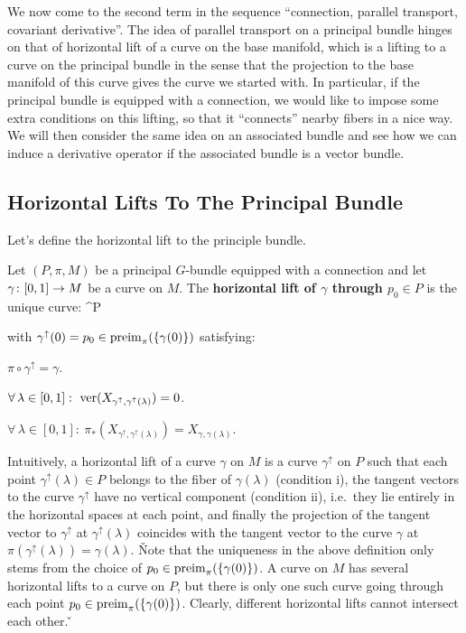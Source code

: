 We now come to the second term in the sequence ``connection, parallel transport, covariant derivative''. The idea of
parallel transport on a principal bundle hinges on that of horizontal lift of a curve on the base manifold, which is
a lifting to a curve on the principal bundle in the sense that the projection to the base manifold of this curve
gives the curve we started with. In particular, if the principal bundle is equipped with a connection, we would like
to impose some extra conditions on this lifting, so that it ``connects'' nearby fibers in a nice way. We will then
consider the same idea on an associated bundle and see how we can induce a derivative operator if the associated
bundle is a vector bundle.

\subsection{Horizontal Lifts To The Principal Bundle}

Let's define the horizontal lift to the principle bundle.

Let $(P,\pi,M)$ be a principal $G$-bundle equipped with a connection and let $\gamma\colon[0,1]\to M$ be a curve on $M$.
The \textbf{horizontal lift of $\gamma$ through $p_0\in P$} is the unique curve:
\bse
\gamma^{\uparrow}\cl [0,1] \to P
\ese

with $\gamma^\uparrow(0)=p_0\in \operatorname{preim}_\pi(\{\gamma(0)\})$ satisfying:
\ben[label=\roman*)]
\item $\pi \circ \gamma^{\uparrow} = \gamma$.
\item $\forall \, \lambda\in [0,1] : \ \ver(X_{\gamma^{\uparrow}, \gamma^{\uparrow}(\lambda)})=0$.
\item $\forall \, \lambda\in [0,1] : \ \pi_*(X_{\gamma^{\uparrow}, \gamma^{\uparrow}(\lambda)})=X_{\gamma,\gamma
(\lambda)}$.
\een
\ed

Intuitively, a horizontal lift of a curve $\gamma$ on $M$ is a curve $\gamma^\uparrow$ on $P$ such that each point
$\gamma^\uparrow(\lambda)\in P$ belongs to the fiber of $\gamma(\lambda)$ (condition i), the tangent vectors to the
curve $\gamma^\uparrow$ have no vertical component (condition ii), i.e.\ they lie entirely in the horizontal spaces
at each point, and finally the projection of the tangent vector to $\gamma^\uparrow$ at $\gamma^\uparrow(\lambda)$
coincides with the tangent vector to the curve $\gamma$ at $\pi (\gamma^\uparrow(\lambda))=\gamma(\lambda)$. \v

Note that the uniqueness in the above definition only stems from the choice of $p_0\in\operatorname{preim}_\pi(\{\gamma(0)\})$. A
curve on $M$ has several horizontal lifts to a curve on $P$, but there is only one such curve going through each
point $p_0\in\operatorname{preim}_\pi(\{\gamma(0)\})$. Clearly, different horizontal lifts cannot intersect each other. \v

